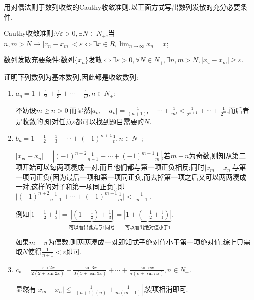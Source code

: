 \documentclass[cn,chinese,fontset]{elegantbook}
\begin{document}
            \begin{exercise}
                用对偶法则于数列收敛的Cauthy收敛准则,以正面方式写出数列发散的充分必要条件.
            \end{exercise}
            \begin{solution}

                Cauthy收敛准则:$\forall \varepsilon>0,\exists N\in N_+$,当$ n,m>N\rightarrow\lvert x_n-x_m\rvert<\varepsilon\Longleftrightarrow \exists x\in R,\lim_{n\to\infty}x_n=x$;

                数列发散充要条件:数列$\{x_n\}$发散$\Longleftrightarrow \exists\varepsilon>0,\forall N\in N_+,\exists n,m>N,\lvert x_n-x_m\rvert\geqslant \varepsilon$.
            \end{solution}

            \begin{exercise}
                证明下列数列为基本数列,因此都是收敛数列:
                \begin{enumerate}
                    \item $a_n=1+\frac{1}{2!}+\frac{1}{3!}+\cdots+\frac{1}{n!},n\in N_+$;
                    \begin{solution}
                        不妨设$m\geqslant n>0$,而显然$\lvert a_m-a_n\rvert=\frac{1}{(n+1)!}+\cdots+\frac{1}{m!}<\frac{1}{2^{n+1}}+\cdots+\frac{1}{2^m}$,而后者是收敛的,知对任意$\varepsilon$都可以找到题目需要的$N$.
                    \end{solution}
                    \item $b_n=1-\frac{1}{2}+\frac{1}{3}-\cdots+(-1)^{n+1}\frac{1}{n},n\in N_+$;
                    \begin{solution}
                        $\lvert x_m-x_n\rvert=\left|(-1)^{n+2}\frac{1}{n+1}+\cdots+(-1)^{m+1}\frac{1}{m}\right|$,若$m-n$为奇数,则知从第二项开始可以每两项凑成一对,而且他们都与第一项正负相反;同时$\lvert x_m-x_n\rvert$与第一项同正负(因为最后一项和第一项同正负,而去掉第一项之后又可以两两凑成一对,这样的对子和第一项同正负),即$\big\lvert (-1)^{n+2}\frac{1}{n+1}+\cdots+(-1)^{m+1}\frac{1}{m}\big\rvert<\lvert \frac{1}{n+1}\rvert$.

                        例如$\left|1-\frac{1}{2}+\frac{1}{3}\right|=\underbrace{\left|(1-\frac{1}{2})+\frac{1}{3}\right|}_{\text{可以看出此式与1同号}}=\underbrace{\left|1+(-\frac{1}{2}+\frac{1}{3})\right|}_{\text{可以看出绝对值小于1}}$.

                        如果$m-n$为偶数,则两两凑成一对即知式子绝对值小于第一项绝对值.综上只需取$N$使得$\frac{1}{n+1}<\varepsilon$即可.
                    \end{solution}
                    \item $c_n=\frac{\sin2x}{2(2+\sin2x)}+\frac{\sin3x}{3(3+\sin3x)}+\cdots+\frac{\sin nx}{n(n+\sin nx)},n\in N_+$.
                    \begin{solution}
                        显然有$\left|x_m-x_n\right|\leqslant\left|\frac{1}{(n+1)(n)}+\frac{1}{m(m-1)}\right|$,裂项相消即可.
                    \end{solution}
                \end{enumerate}
            \end{exercise}
\end{document}
